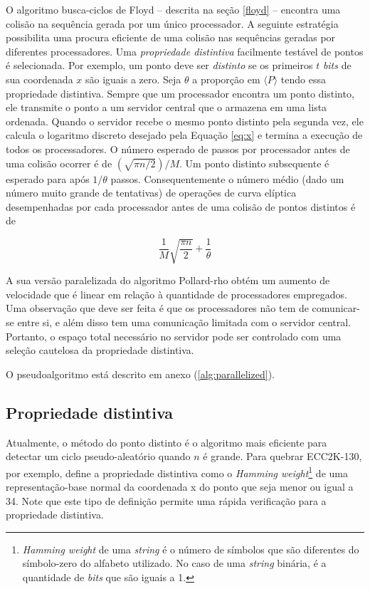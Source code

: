O algoritmo busca-ciclos de Floyd -- descrita na seção \ref{floyd} -- encontra uma colisão na sequência gerada por um único processador. A seguinte estratégia possibilita uma procura eficiente de uma colisão nas sequências geradas por diferentes processadores. Uma \textit{propriedade distintiva} facilmente testável de pontos é selecionada. Por exemplo, um ponto deve ser \textit{distinto} se os primeiros \(t\) \textit{bits} de sua coordenada \(x\) são iguais a zero. Seja \(\theta\) a proporção em $\langle P \rangle$ tendo essa propriedade distintiva. Sempre que um processador encontra um ponto distinto, ele transmite o ponto a um servidor central que o armazena em uma lista ordenada. Quando o servidor recebe o mesmo ponto distinto pela segunda vez, ele calcula o logaritmo discreto desejado pela Equação \ref{eq:x} e termina a execução de todos os processadores. O número esperado de passos por processador antes de uma colisão ocorrer é de $(\sqrt{\pi n/2})/M$. Um ponto distinto subsequente é esperado para após $1/\theta$ passos. Consequentemente o número médio (dado um número muito grande de tentativas) de operações de curva elíptica desempenhadas por cada processador antes de uma colisão de pontos distintos é de

\begin{equation}
\dfrac{1}{M} \sqrt{\dfrac{\pi n}{2}} + \dfrac{1}{\theta} \label{eq:execParallelized}
\end{equation}

A sua versão paralelizada do algoritmo Pollard-rho obtém um aumento de velocidade que é linear em relação à quantidade de processadores empregados. Uma observação que deve ser feita é que os processadores não tem de comunicar-se entre si, e além disso tem uma comunicação limitada com o servidor central. Portanto, o espaço total necessário no servidor pode ser controlado com uma seleção cautelosa da propriedade distintiva.

O pseudoalgoritmo está descrito em anexo (\ref{alg:parallelized}).

%
%
\subsection{Propriedade distintiva}
\label{sec:distinguished}
Atualmente, o método do ponto distinto é o algoritmo mais eficiente para detectar um ciclo pseudo-aleatório quando \(n\) é grande. Para quebrar ECC2K-130, por exemplo, \cite{Bailey:2009} define a propriedade distintiva como o \textit{Hamming weight}\footnote{\textit{Hamming weight} de uma \textit{string} é o número de símbolos que são diferentes do símbolo-zero do alfabeto utilizado. No caso de uma \textit{string} binária, é a quantidade de \textit{bits} que são iguais a 1.} de uma representação-base normal da coordenada x do ponto que seja menor ou igual a 34. Note que este tipo de definição permite uma rápida verificação para a propriedade distintiva.

